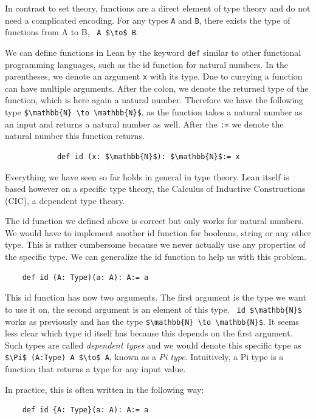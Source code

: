 In contrast to set theory, functions are a direct element of type theory and do not need a complicated encoding. For any types \lstinline|A| and \lstinline|B|, there exists the type of functions from A to B, \lstinline| A $\to$ B|.

We can define functions in Lean by the keyword \lstinline|def| similar to other functional programming languages, such as the id function for natural numbers. In the parentheses, we denote an argument \lstinline|x| with its type. Due to currying a function can have multiple arguments. After the colon, we denote the returned type of the function, which is here again a natural number. Therefore we have the following type \lstinline|$\mathbb{N} \to \mathbb{N}$|, as the function takes a natural number as an input and returns a natural number as well. After the \lstinline|:=| we denote the natural number this function returns. 
\begin{lstlisting}
            def id (x: $\mathbb{N}$): $\mathbb{N}$:= x
\end{lstlisting}

Everything we have seen so far holds in general in type theory. Lean itself is based however on a specific type theory, the Calculus of Inductive Constructions (CIC), a dependent type theory\cite{Lean4, CoC}.

The id function we defined above is correct but only works for natural numbers. We would have to implement another id function for booleans, string or any other type. This is rather cumbersome because we never actually use any properties of the specific type. We can generalize the id function to help us with this problem.

\begin{lstlisting}
    def id (A: Type)(a: A): A:= a
\end{lstlisting}

This id function has now two arguments. The first argument is the type we want to use it on, the second argument is an element of this type. \lstinline| id $\mathbb{N}$| works as previously and has the type \lstinline|$\mathbb{N} \to \mathbb{N}$|. It seems less clear which type id itself has because this depends on the first argument.
Such types are called \textit{dependent types} and we would denote this specific type as \lstinline|$\Pi$ (A:Type) A $\to$ A|, known as a \textit{Pi type}. Intuitively, a Pi type is a function that returns a type for any input value.

In practice, this is often written in the following way:
\begin{lstlisting}
    def id {A: Type}(a: A): A:= a
\end{lstlisting}

